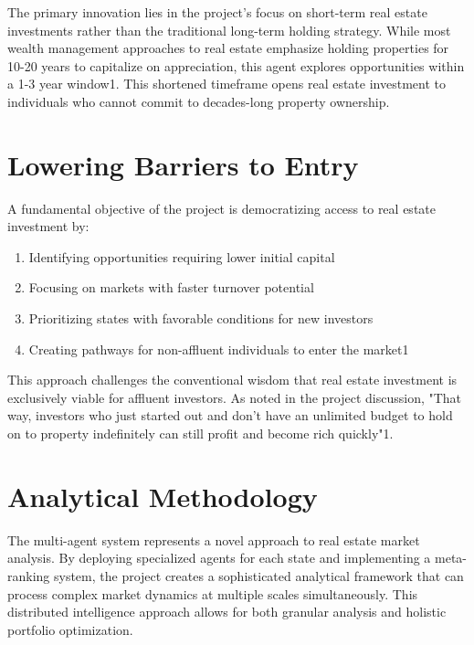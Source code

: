 The primary innovation lies in the project's focus on short-term real estate investments rather than the traditional long-term holding strategy. While most wealth management approaches to real estate emphasize holding properties for 10-20 years to capitalize on appreciation, this agent explores opportunities within a 1-3 year window1. This shortened timeframe opens real estate investment to individuals who cannot commit to decades-long property ownership.


\section*{Lowering Barriers to Entry}

A fundamental objective of the project is democratizing access to real estate investment by:


\begin{enumerate}

\item
Identifying opportunities requiring lower initial capital




\item
Focusing on markets with faster turnover potential




\item
Prioritizing states with favorable conditions for new investors




\item
Creating pathways for non-affluent individuals to enter the market1




\end{enumerate}

This approach challenges the conventional wisdom that real estate investment is exclusively viable for affluent investors. As noted in the project discussion, "That way, investors who just started out and don't have an unlimited budget to hold on to property indefinitely can still profit and become rich quickly"1.


\section*{Analytical Methodology}

The multi-agent system represents a novel approach to real estate market analysis. By deploying specialized agents for each state and implementing a meta-ranking system, the project creates a sophisticated analytical framework that can process complex market dynamics at multiple scales simultaneously. This distributed intelligence approach allows for both granular analysis and holistic portfolio optimization.


